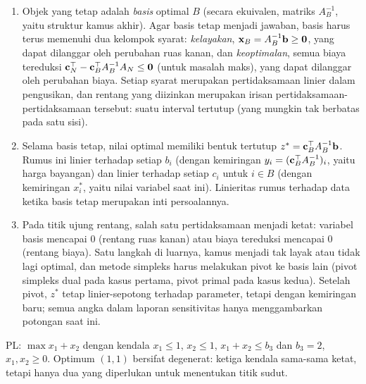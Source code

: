\begin{enumerate}
\item Objek yang tetap adalah \emph{basis} optimal $B$ (secara ekuivalen, matriks $A_B^{-1}$, yaitu struktur kamus akhir). Agar basis tetap menjadi jawaban, basis harus terus memenuhi dua kelompok syarat: \emph{kelayakan}, $\mathbf{x}_B = A_B^{-1}\mathbf{b} \ge \mathbf{0}$, yang dapat dilanggar oleh perubahan ruas kanan, dan \emph{keoptimalan}, semua biaya tereduksi $\mathbf{c}_N^\top - \mathbf{c}_B^\top A_B^{-1} A_N \le \mathbf{0}$ (untuk masalah maks), yang dapat dilanggar oleh perubahan biaya. Setiap syarat merupakan pertidaksamaan linier dalam pengusikan, dan rentang yang diizinkan merupakan irisan pertidaksamaan-pertidaksamaan tersebut: suatu interval tertutup (yang mungkin tak berbatas pada satu sisi).
\item Selama basis tetap, nilai optimal memiliki bentuk tertutup $z^* = \mathbf{c}_B^\top A_B^{-1} \mathbf{b}$. Rumus ini linier terhadap setiap $b_i$ (dengan kemiringan $y_i = (\mathbf{c}_B^\top A_B^{-1})_i$, yaitu harga bayangan) dan linier terhadap setiap $c_i$ untuk $i \in B$ (dengan kemiringan $x_i^*$, yaitu nilai variabel saat ini). Linieritas rumus terhadap data ketika basis tetap merupakan inti persoalannya.
\item Pada titik ujung rentang, salah satu pertidaksamaan menjadi ketat: variabel basis mencapai $0$ (rentang ruas kanan) atau biaya tereduksi mencapai $0$ (rentang biaya). Satu langkah di luarnya, kamus menjadi tak layak atau tidak lagi optimal, dan metode simpleks harus melakukan pivot ke basis lain (pivot simpleks dual pada kasus pertama, pivot primal pada kasus kedua). Setelah pivot, $z^*$ tetap linier-sepotong terhadap parameter, tetapi dengan kemiringan baru; semua angka dalam laporan sensitivitas hanya menggambarkan potongan saat ini.
\end{enumerate}


PL: $\max x_1 + x_2$ dengan kendala $x_1 \le 1$, $x_2 \le 1$, $x_1 + x_2 \le b_3$ dan $b_3 = 2$, $x_1, x_2 \ge 0$. Optimum $(1,1)$ bersifat degenerat: ketiga kendala sama-sama ketat, tetapi hanya dua yang diperlukan untuk menentukan titik sudut.

